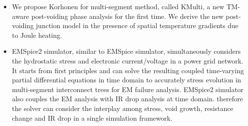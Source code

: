  \begin{itemize}


\item We propose Korhonen for multi-segment method, called KMulti, a new TM-aware post-voiding phase analysis for the first time. We derive the 
new post-voiding junction model in the presence of spatial temperature gradients
  due to Joule heating. 
   



 \item EMSpice2 simulator, similar to EMSpice simulator, simultaneously considers the hydrostatic
stress and electronic current/voltage in a power
grid network. It starts from first principles
and can solve the resulting coupled time-varying
partial differential equations in time domain to accurately
stress evolution in multi-segment interconnect trees for
EM failure analysis. EMSpice2 simulator
also couples the EM analysis with IR drop analysis at
time domain. therefore the solver can consider the interplay
among stress, void growth, resistance change and IR drop
in a single simulation framework.


\end{itemize}
